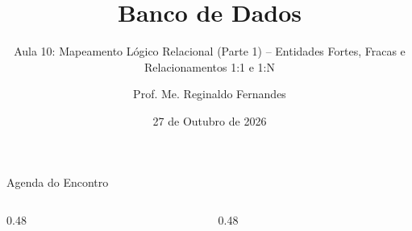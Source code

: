 \documentclass[aspectratio=169,utf8,t]{beamer}
\author{Prof. Me. Reginaldo Fernandes}
\institute{Instituto Federal do Ceará -- Campus Tauá \\ Tecnologia em Telemática}
\title{Banco de Dados}
\subtitle{Aula 10: Mapeamento Lógico Relacional (Parte 1) -- Entidades Fortes, Fracas e Relacionamentos 1:1 e 1:N}
\date{27 de Outubro de 2026}
\begin{document}
\frame[plain]{\titlepage}

\begin{frame}{Agenda do Encontro}
  \begin{columns}[t]
    \begin{column}{0.48\textwidth}
      \scriptsize
      \tableofcontents[sections={1-5}]
    \end{column}
    \begin{column}{0.48\textwidth}
      \scriptsize
      \tableofcontents[sections={6-9}]
    \end{column}
  \end{columns}
\end{frame}










\end{document}

